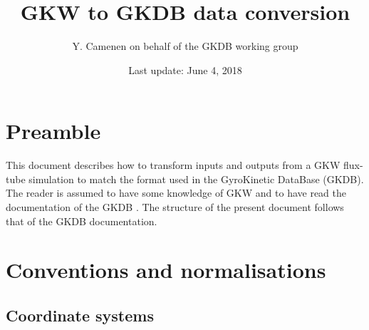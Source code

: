 \documentclass[a4paper]{report}
\begin{document}
\title{GKW to GKDB data conversion}

\author{Y. Camenen on behalf of the GKDB working group}

\date{Last update: June 4, 2018}

\maketitle


\tableofcontents

\chapter{Preamble}
This document describes how to transform inputs and outputs from a GKW flux-tube simulation to match the format used in the GyroKinetic DataBase (GKDB). \\ 
The reader is assumed to have some knowledge of GKW \cite{Peeters:CPC09,GKW:wiki} and to have read the documentation of the GKDB \cite{GKDB:wiki}. The structure of the present document follows that of the GKDB documentation.

\chapter{Conventions and normalisations}

\section{Coordinate systems}
\end{document}
